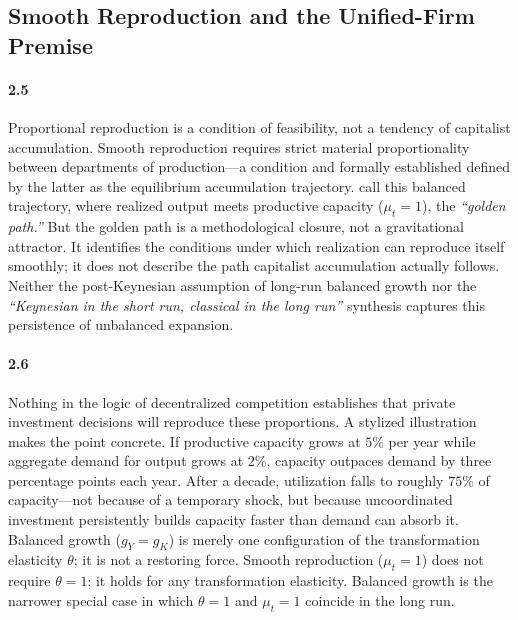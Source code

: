 \subsection{Smooth Reproduction and the Unified-Firm Premise}

\paragraph{2.5} Proportional reproduction is a condition of feasibility, not a
tendency of capitalist accumulation. Smooth reproduction requires
strict material proportionality between departments of
production---a condition \citet{Basu2022} and \citet{Okishio2022} formally established defined by the latter as the equilibrium accumulation trajectory. \citet{Bergmann2009} call
this balanced trajectory, where realized output meets productive
capacity ($\mu_t = 1$), the \textit{``golden path.''} But the golden path
is a methodological closure, not a gravitational attractor. It
identifies the conditions under which realization can reproduce
itself smoothly; it does not describe the path capitalist accumulation
actually follows. Neither the post-Keynesian assumption of long-run balanced
growth \citep{BleckerSetterfield2019} nor the \textit{``Keynesian in the short run, classical in the long run''} synthesis \citep{DumenilLevy1999} captures this persistence of unbalanced expansion.

\paragraph{2.6} Nothing in the logic of decentralized competition
establishes that private investment decisions will reproduce
these proportions. A stylized illustration makes the point
concrete. If productive capacity grows at $5\%$ per year while
aggregate demand for output grows at $2\%$, capacity outpaces
demand by three percentage points each year. After a decade,
utilization falls to roughly $75\%$ of capacity---not because
of a temporary shock, but because uncoordinated investment
persistently builds capacity faster than demand can absorb it.
Balanced growth ($g_Y = g_K$) is merely one configuration of
the transformation elasticity $\theta$; it is not a restoring
force. Smooth reproduction ($\mu_t = 1$) does not require
$\theta = 1$; it holds for any transformation elasticity.
Balanced growth is the narrower special case in which
$\theta = 1$ and $\mu_t = 1$ coincide in the long run.


